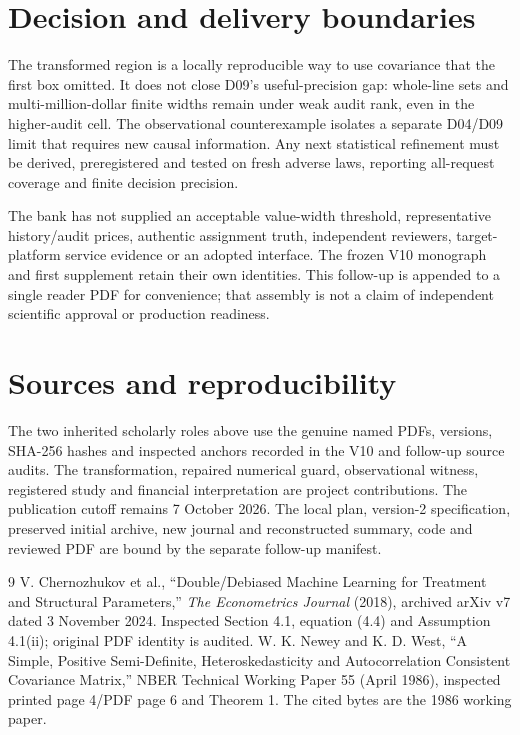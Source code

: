 \documentclass[11pt,a4paper]{article}
\begin{document}
\section{Decision and delivery boundaries}

The transformed region is a locally reproducible way to use covariance that
the first box omitted. It does not close D09's useful-precision gap: whole-line
sets and multi-million-dollar finite widths remain under weak audit rank,
even in the higher-audit cell. The observational counterexample isolates a
separate D04/D09 limit that requires new causal information. Any next
statistical refinement must be derived, preregistered and tested on fresh
adverse laws, reporting all-request coverage and finite decision precision.

The bank has not supplied an acceptable value-width threshold, representative
history/audit prices, authentic assignment truth, independent reviewers,
target-platform service evidence or an adopted interface. The frozen V10
monograph and first supplement retain their own identities. This follow-up
is appended to a single reader PDF for convenience; that assembly is not a
claim of independent scientific approval or production readiness.

\section*{Sources and reproducibility}

The two inherited scholarly roles above use the genuine named PDFs, versions,
SHA-256 hashes and inspected anchors recorded in the V10 and follow-up source
audits. The transformation, repaired numerical guard, observational witness,
registered study and financial interpretation are project contributions.
The publication cutoff remains 7 October 2026. The local plan, version-2
specification, preserved initial archive, new journal and reconstructed summary,
code and reviewed PDF are bound by the separate follow-up manifest.

\begin{thebibliography}{9}
 V. Chernozhukov et al., ``Double/Debiased Machine Learning
for Treatment and Structural Parameters,'' \emph{The Econometrics Journal}
(2018), archived arXiv v7 dated 3 November 2024. Inspected Section 4.1,
equation (4.4) and Assumption 4.1(ii); original PDF identity is audited.
 W. K. Newey and K. D. West, ``A Simple, Positive
Semi-Definite, Heteroskedasticity and Autocorrelation Consistent Covariance
Matrix,'' NBER Technical Working Paper 55 (April 1986), inspected printed
page 4/PDF page 6 and Theorem 1. The cited bytes are the 1986 working paper.
\end{thebibliography}
\end{document}
